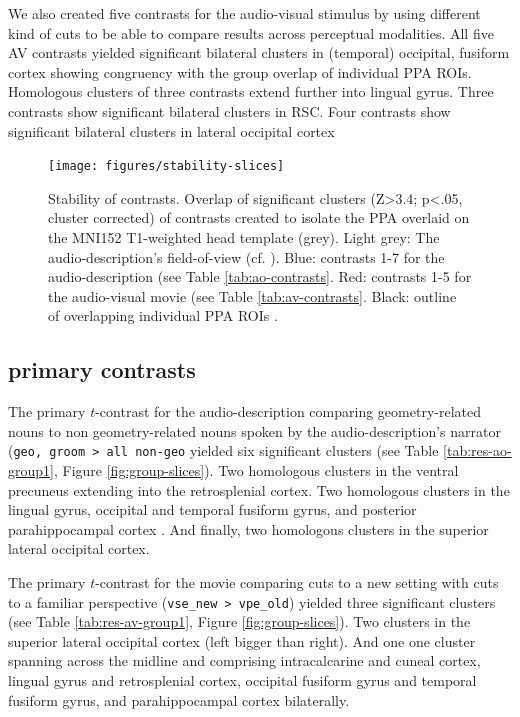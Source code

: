 \documentclass[english]{article}
\begin{document}
We also created five contrasts for the audio-visual stimulus by using different
kind of cuts to be able to compare results across perceptual modalities.
All five AV contrasts yielded significant bilateral clusters in (temporal)
occipital, fusiform cortex showing congruency with the group overlap of
individual PPA ROIs.
Homologous clusters of three contrasts extend further into lingual gyrus.
Three contrasts show significant bilateral clusters in RSC.
Four contrasts show significant bilateral clusters in lateral occipital cortex


\begin{figure} \centering
    \texttt{[image: figures/stability-slices]}
    \caption{Stability of contrasts. Overlap of significant clusters (Z>3.4;
        p<.05, cluster corrected) of contrasts created to isolate the PPA
        overlaid on the MNI152 T1-weighted head template (grey).
        Light grey: The audio-description's field-of-view
        (cf. \citep{hanke2014audiomovie}).
        Blue: contrasts 1-7 for the audio-description (see Table \ref{tab:ao-contrasts}.
        Red: contrasts 1-5 for the audio-visual movie (see Table \ref{tab:av-contrasts}.
        Black: outline of overlapping individual PPA ROIs
        \citep{sengupta2016extension}.}
    \label{fig:stability-slices}
\end{figure}


\subsection{primary contrasts}
The primary $t$-contrast for the audio-description comparing geometry-related
nouns to non geometry-related nouns spoken by the audio-description's narrator
(\texttt{geo, groom > all non-geo} yielded six significant clusters (see Table
\ref{tab:res-ao-group1}, Figure \ref{fig:group-slices}).
Two homologous clusters in the ventral precuneus extending into the
retrosplenial cortex.
Two homologous clusters in the lingual gyrus, occipital and temporal fusiform
gyrus, and posterior parahippocampal cortex .
And finally, two homologous clusters in the superior lateral occipital cortex.

The primary $t$-contrast for the movie comparing cuts to a new setting with cuts
to a familiar perspective (\texttt{vse\_new > vpe\_old}) yielded three
significant clusters (see Table \ref{tab:res-av-group1}, Figure
\ref{fig:group-slices}).
Two clusters in the superior lateral occipital cortex (left bigger than right).
And one one cluster spanning across the midline and comprising intracalcarine
and cuneal cortex, lingual gyrus and retrosplenial cortex,  occipital fusiform
gyrus and temporal fusiform gyrus, and parahippocampal cortex bilaterally.
\end{document}
